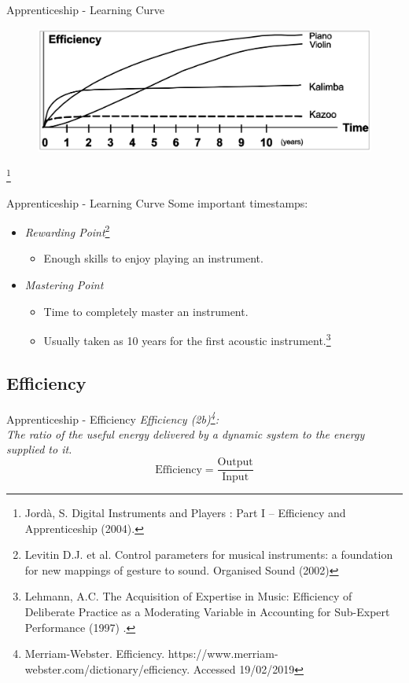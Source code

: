 \documentclass{beamer}
\newcommand\blfootnote[1]{%
  \begingroup
  \renewcommand\thefootnote{}\footnote{#1}%
  \addtocounter{footnote}{-1}%
  \endgroup
}
\begin{document}
\begin{frame}{Apprenticeship - Learning Curve}
    \begin{figure}[h]
        \includegraphics[width=\textwidth]{learningsergi.png}
    \end{figure}\blfootnote{Jordà, S. Digital Instruments and Players : Part I – Efficiency and Apprenticeship (2004).}
\end{frame}

\begin{frame}{Apprenticeship - Learning Curve}
    Some important timestamps:
    \begin{itemize}
        \item \textit{Rewarding Point}\footnote{Levitin D.J. et al. Control parameters for musical instruments: a foundation for new mappings of gesture to sound. Organised Sound (2002)}
        \begin{itemize}
            \item Enough skills to enjoy playing an instrument.
        \end{itemize}
        \item \textit{Mastering Point}
        \begin{itemize}
            \item Time to completely master an instrument.
            \item Usually taken as 10 years for the first acoustic instrument.\footnote{Lehmann, A.C. The Acquisition of Expertise in Music: Efficiency of Deliberate Practice as a Moderating Variable in Accounting for Sub-Expert Performance (1997) .}
        \end{itemize}
    \end{itemize}
\end{frame}

\subsection{Efficiency}

\begin{frame}{Apprenticeship - Efficiency}
   \textit{Efficiency (2b)\footnote{Merriam-Webster. Efficiency. https://www.merriam-webster.com/dictionary/efficiency. Accessed 19/02/2019}: \\
   \vspace{5mm}
   The ratio of the useful energy delivered by a dynamic system to the energy supplied to it.}
   \begin{equation*}
       \text{Efficiency} = \frac{\text{Output}}{\text{Input}}
   \end{equation*}
\end{frame}
\end{document}
